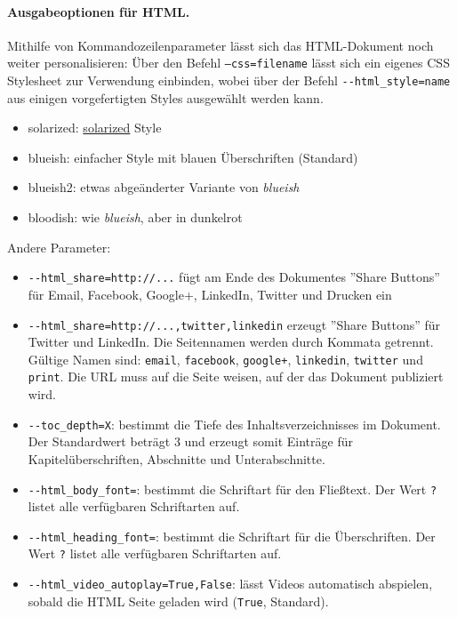 \documentclass[%
oneside,                 %
final,                   %
chapterprefix=true,      %
open=right,              %
10pt]{book}
\begin{document}
\paragraph{ Ausgabeoptionen für HTML.}
Mithilfe von Kommandozeilenparameter lässt sich das HTML-Dokument noch weiter personalisieren:
Über den Befehl \texttt{--css=filename} lässt sich ein eigenes CSS Stylesheet zur Verwendung einbinden, wobei über der Befehl \Verb!--html_style=name! aus einigen vorgefertigten Styles ausgewählt werden kann.
\begin{itemize}
\item solarized: \href{{http://ethanschoonover.com/solarized}}{solarized} Style

\item blueish: einfacher Style mit blauen Überschriften (Standard)

\item blueish2: etwas abgeänderter Variante von \emph{blueish}

\item bloodish: wie \emph{blueish}, aber in dunkelrot
\end{itemize}

\noindent
Andere Parameter:
\begin{itemize}
\item \Verb!--html_share=http://...! fügt am Ende des Dokumentes ''Share Buttons'' für Email, Facebook, Google+, LinkedIn, Twitter und Drucken ein

\item \Verb!--html_share=http://...,twitter,linkedin! erzeugt ''Share Buttons'' für Twitter und LinkedIn. Die Seitennamen werden durch Kommata getrennt. Gültige Namen sind: \texttt{email}, \texttt{facebook}, \texttt{google+}, \texttt{linkedin}, \texttt{twitter} und \texttt{print}. Die URL muss auf die Seite weisen, auf der das Dokument publiziert wird.

\item \Verb!--toc_depth=X!: bestimmt die Tiefe des Inhaltsverzeichnisses im Dokument. Der Standardwert beträgt 3 und erzeugt somit Einträge für Kapitelüberschriften, Abschnitte und Unterabschnitte.

\item \Verb!--html_body_font=!: bestimmt die Schriftart für den Fließtext. Der Wert \texttt{?} listet alle verfügbaren Schriftarten auf.

\item \Verb!--html_heading_font=!: bestimmt die Schriftart für die Überschriften. Der Wert \texttt{?} listet alle verfügbaren Schriftarten auf.

\item \Verb!--html_video_autoplay=True,False!: lässt Videos automatisch abspielen, sobald die HTML Seite geladen wird (\texttt{True}, Standard).
\end{itemize}
\end{document}
